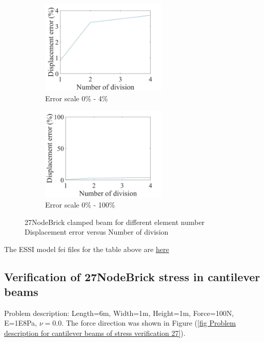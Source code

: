 \documentclass[fleqn,11pt,letter]{article}
\begin{document}
\begin{figure}[H]
  \begin{subfigure}{0.5\textwidth}
    \centering
    \includegraphics[width=6cm]{../Figure_files/27NodeBrick/error27brick_clamped_beam_diff_element.jpeg}
    \caption{Error scale 0\% - 4\%}
  \end{subfigure}
  \begin{subfigure}{0.5\textwidth}
    \centering
    \includegraphics[width=6cm]{../Figure_files/27NodeBrick/error27brick_clamped_beam_diff_element100.jpeg}
    \caption{Error scale 0\% - 100\%}
  \end{subfigure}
  \captionsetup{justification=centering,margin=3cm}
  \caption{27NodeBrick clamped beam for different element number\\
      Displacement error   versus   Number of division}
  \label{fig error 27NodeBrick clamped beam for different element number}
\end{figure}


The ESSI model fei files for the table above are \href{https://github.com/yuan-energy/ESSI_Verification/blob/master/27NodeBrick/clamped_beam_cut/clamped_beam_cut.tar.gz?raw=true}{here}

\newpage
\subsection{Verification of 27NodeBrick stress in cantilever beams}





Problem description: Length=6m, Width=1m, Height=1m, Force=100N, E=1E8Pa, $\nu=0.0$. The force direction was shown in Figure (\ref{fig Problem description for cantilever beams of stress verification 27}). 
\end{document}
